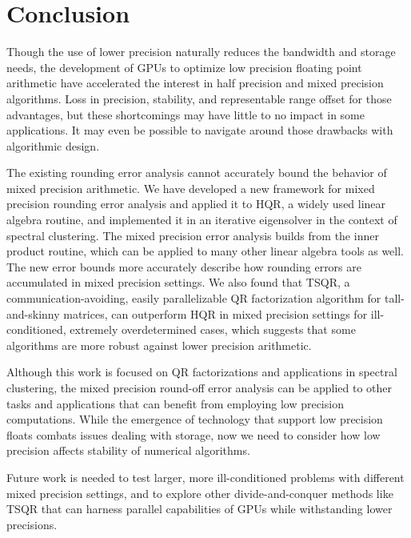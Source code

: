 \documentclass[review,onefignum,onetabnum]{siamart190516}
\begin{document}
\section{Conclusion}
Though the use of lower precision naturally reduces the bandwidth and storage needs, the development of GPUs to optimize low precision floating point arithmetic have accelerated the interest in half precision and mixed precision algorithms. 
Loss in precision, stability, and representable range offset for those advantages, but these shortcomings may have little to no impact in some applications.
It may even be possible to navigate around those drawbacks with algorithmic design. \par 

The existing rounding error analysis cannot accurately bound the behavior of mixed precision arithmetic.
We have developed a new framework for mixed precision rounding error analysis and applied it to HQR, a widely used linear algebra routine, and implemented it in an iterative eigensolver in the context of spectral clustering. 
The mixed precision error analysis builds from the inner product routine, which can be applied to many other linear algebra tools as well.
The new error bounds more accurately describe how rounding errors are accumulated in mixed precision settings.
We also found that TSQR, a communication-avoiding, easily parallelizable QR factorization algorithm for tall-and-skinny matrices, can outperform HQR in mixed precision settings for ill-conditioned, extremely overdetermined cases, which suggests that some algorithms are more robust against lower precision arithmetic.

Although this work is focused on QR factorizations and applications in spectral clustering, the mixed precision round-off error analysis can be applied to other tasks and applications that can benefit from employing low precision computations. 
While the emergence of technology that support low precision floats combats issues dealing with storage, now we need to consider how low precision affects stability of numerical algorithms. 

Future work is needed to test larger, more ill-conditioned problems with different mixed precision settings, and to explore other divide-and-conquer methods like TSQR that can harness parallel capabilities of GPUs while withstanding lower precisions. 

%
%

\end{document}
